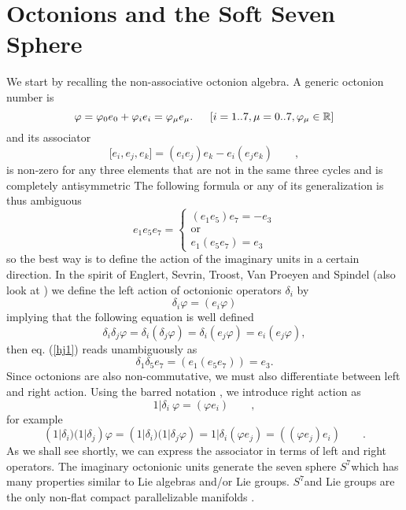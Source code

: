\documentclass[a4paper,12pt]{book}
\begin{document}
\section{Octonions and the Soft Seven Sphere}

We start by recalling the non-associative octonion algebra. A generic
octonion number is 
\begin{equation}
\varphi =\varphi _{0}e_{0}+\varphi _{i}e_{i}=\varphi _{\mu }e_{\mu
}.\;\;\;\;\;\left[ i=1..7,\mu =0..7,\varphi _{\mu }\in \Bbb{R}\right]
\end{equation}
and its associator 
\begin{equation}
\lbrack e_{i},e_{j},e_{k}]=(e_{i}e_{j})e_{k}-e_{i}(e_{j}e_{k})\qquad ,
\end{equation}
is non-zero for any three elements that are not in the same three cycles and
is completely antisymmetric The following formula or any of its
generalization is thus ambiguous 
\begin{equation}
e_{1}e_{5}e_{7}=\left\{ 
\begin{array}{c}
(e_{1}e_{5})e_{7}=-e_{3} \\ 
\mbox{or} \\ 
e_{1}(e_{5}e_{7})=e_{3}
\end{array}
\right.  \label{hj1}
\end{equation}
so the best way is to define the action of the imaginary units in a certain
direction. In the spirit of Englert, Sevrin, Troost, Van Proeyen and Spindel%
\cite{estps} (also look at \cite{shaeffer}) we define the left action of
octonionic operators $\delta _{i}$ by 
\begin{equation}
\delta _{i}\varphi =(e_{i}\varphi )
\end{equation}
implying that the following equation is well defined 
\begin{equation}
\delta _{i}\delta _{j}\varphi =\delta _{i}(\delta _{j}\varphi )=\delta
_{i}(e_{j}\varphi )=e_{i}(e_{j}\varphi ),
\end{equation}
then eq. (\ref{hj1}) reads unambiguously as 
\begin{equation}
\delta _{1}\delta _{5}e_{7}=(e_{1}(e_{5}e_{7}))=e_{3}.
\end{equation}
Since octonions are also non-commutative, we must also differentiate between
left and right action. Using the barred notation \cite{rot}, we introduce
right action as 
\begin{equation}
1|\delta _{i}~\varphi =(\varphi e_{i})\qquad ,
\end{equation}
for example 
\begin{equation}
(1|\delta _{i})(1|\delta _{j})\varphi =(1|\delta _{i})(1|\delta _{j}\varphi
)=1|\delta _{i}(\varphi e_{j})=((\varphi e_{j})e_{i})\qquad .
\end{equation}
As we shall see shortly, we can express the associator in terms of left and
right operators. The imaginary octonionic units generate the seven sphere $%
S^{7}$which has many properties similar to Lie algebras and/or Lie groups. $%
S^{7}$and Lie groups are the only non-flat compact parallelizable manifolds 
\cite{cart1}\cite{cart2}\cite{wolf}.
\end{document}

